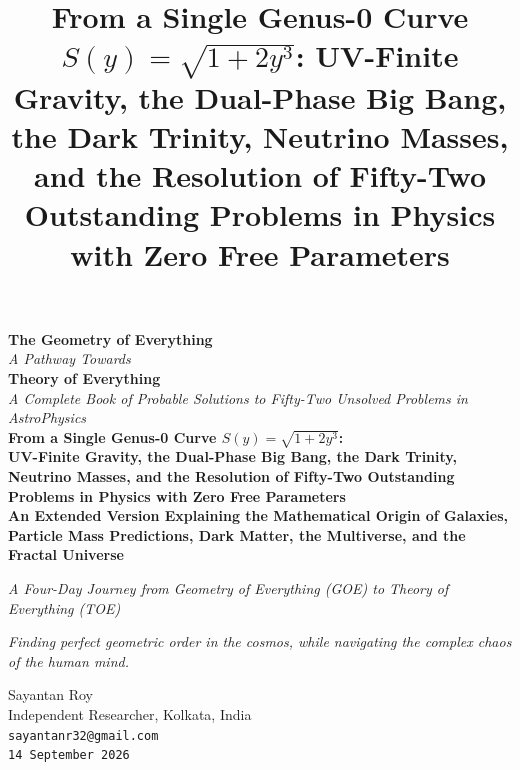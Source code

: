 \documentclass[12pt,oneside,openany]{book}
\begin{document}
\begin{titlepage}
    \centering

    \vspace*{1cm} %

      {\Huge\bfseries The Geometry of Everything}\\[0.35cm]
    {\Large\itshape A Pathway Towards}\\[0.15cm]
    {\Huge\bfseries Theory of Everything}\\[0.9cm]
    {\LARGE \textit{A Complete Book of Probable Solutions to Fifty-Two Unsolved Problems in AstroPhysics}}\\[1.5cm]

    {\Large \textbf{From a Single Genus-0 Curve \(S(y) = \sqrt{1+2y^3}\):}}\\[0.5cm]
{\large\textbf{UV-Finite Gravity, the Dual-Phase Big Bang, the Dark Trinity,
Neutrino Masses, and the Resolution of Fifty-Two Outstanding Problems
in Physics with Zero Free Parameters}}\\[0.35cm]
{\large\textbf{An Extended Version Explaining the Mathematical Origin of
Galaxies, Particle Mass Predictions, Dark Matter, the Multiverse,
and the Fractal Universe}}

    {\small \textit{A Four-Day Journey from Geometry of Everything (GOE) to Theory of Everything (TOE)}}\\[1.5cm]
    \begin{center}

        \textit{\large Finding perfect geometric order in the cosmos, while navigating the complex chaos of the human mind.}
    \end{center}

    \vspace{1cm}

    {\LARGE Sayantan Roy}\\[0.4cm]
    {\large Independent Researcher, Kolkata, India}\\[0.2cm]
    {\large \texttt{sayantanr32@gmail.com}}\\[0.2cm]
    {\large\texttt{14 September 2026}}

    \vfill %

\end{titlepage}

\title{\textbf{From a Single Genus-0 Curve $S(y) = \sqrt{1+2y^3}$: UV-Finite Gravity, the Dual-Phase Big Bang, the Dark Trinity, Neutrino Masses, and the Resolution of Fifty-Two Outstanding Problems in Physics with Zero Free Parameters}}
\end{document}
